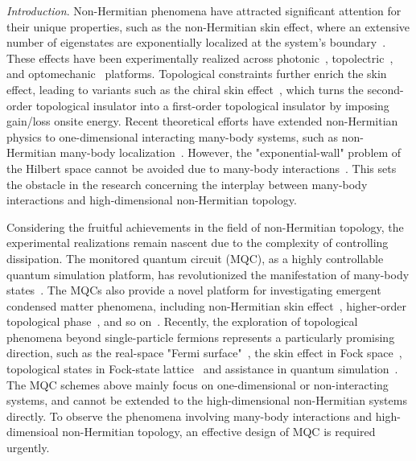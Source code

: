 \documentclass[longbibliography, aps, prx, amsmath, amssymb, amsfonts, twocolumn,superscriptaddress, footinbib]{revtex4-1}
\begin{document}
	\textit{Introduction}. 
	Non-Hermitian phenomena have attracted significant attention for their unique properties, such as the non-Hermitian skin effect, where an extensive number of eigenstates are exponentially localized at the system's boundary~\cite{RN1166,RN1168,gong2018topological,kawabata2019symmetry,RN1212,RN1214,RN1217,RN1160}. 
	These effects have been experimentally realized across photonic~\cite{RN1165,RN1167,RN1227,nie2023non}, topolectric~\cite{zou2021observation,RN2,RN1225}, and optomechanic~\cite{RN632,RN1226} platforms. Topological constraints further enrich the skin effect, leading to variants such as the chiral skin effect~\cite{nakamura2023universal,ma2024non,schindler2023hermitian,lee2019hybrid,RN1221}, which turns the second-order topological insulator into a first-order topological insulator by imposing gain/loss onsite energy. 
	Recent theoretical efforts have extended non-Hermitian physics to one-dimensional interacting many-body systems, such as non-Hermitian many-body localization~\cite{mak2024statics,hamazaki2019non}. However, the "exponential-wall" problem of the Hilbert space cannot be avoided due to many-body interactions~\cite{Kohn1999}. This sets the obstacle in the research concerning the interplay between many-body interactions and high-dimensional non-Hermitian topology.
    

	Considering the fruitful achievements in the field of non-Hermitian topology, the experimental realizations remain nascent due to the complexity of controlling dissipation.
    The monitored quantum circuit (MQC), as a highly controllable quantum simulation platform, has revolutionized the manifestation of many-body states~\cite{skinner2019measurement,nahum2017quantum,gullans2020dynamical,koh2023measurement,li2023cross,choi2020quantum,minato2022fate,yang2025bridging,potter2022entanglement,iqbal2024non,zhang2025physics}. 
	The MQCs also provide a novel platform for investigating emergent condensed matter phenomena, including non-Hermitian skin effect~\cite{fleckenstein2022non}, higher-order topological phase~\cite{koh2024realization}, and so on~\cite{iqbal2024non}. Recently, the exploration of topological phenomena beyond single-particle fermions represents a particularly promising direction, such as the real-space "Fermi surface"~\cite{shen2025observation}, the skin effect in Fock space~\cite{shen2024enhanced,shimomura2024general}, topological states in Fock-state lattice~\cite{deng2022observing} and assistance in quantum simulation~\cite{zhao2025}. 
	The MQC schemes above mainly focus on one-dimensional or non-interacting systems, and cannot be extended to the high-dimensional non-Hermitian systems directly. To observe the phenomena involving many-body interactions and high-dimensioal non-Hermitian topology, an effective design of MQC is required urgently.
\end{document}
